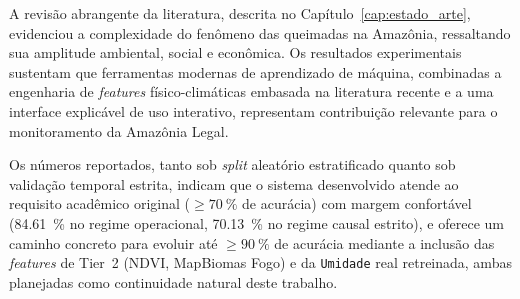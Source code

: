 A revisão abrangente da literatura, descrita no Capítulo~\ref{cap:estado_arte}, evidenciou a complexidade do fenômeno das queimadas na Amazônia, ressaltando sua amplitude ambiental, social e econômica. Os resultados experimentais sustentam que ferramentas modernas de aprendizado de máquina, combinadas a engenharia de \emph{features} físico-climáticas embasada na literatura recente e a uma interface explicável de uso interativo, representam contribuição relevante para o monitoramento da Amazônia Legal.

Os números reportados, tanto sob \emph{split} aleatório estratificado quanto sob validação temporal estrita, indicam que o sistema desenvolvido atende ao requisito acadêmico original (\(\geq \SI{70}{\percent}\) de acurácia) com margem confortável (\SI{84,61}{\percent} no regime operacional, \SI{70,13}{\percent} no regime causal estrito), e oferece um caminho concreto para evoluir até \(\geq \SI{90}{\percent}\) de acurácia mediante a inclusão das \emph{features} de Tier~2 (NDVI, MapBiomas Fogo) e da \texttt{Umidade} real retreinada, ambas planejadas como continuidade natural deste trabalho.

